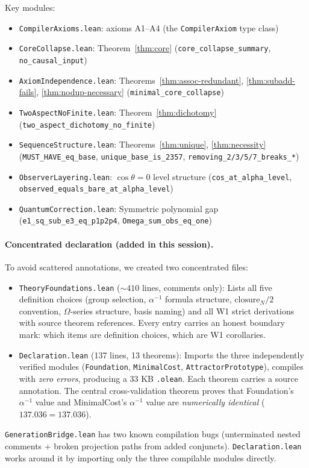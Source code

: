 ﻿\documentclass[11pt]{article}
\begin{document}
Key modules:
\begin{itemize}
\item \texttt{CompilerAxioms.lean}:
  axioms A1--A4 (the \texttt{CompilerAxiom} type class)
\item \texttt{CoreCollapse.lean}:
  Theorem~\ref{thm:core} (\texttt{core\_collapse\_summary},
  \texttt{no\_causal\_input})
\item \texttt{AxiomIndependence.lean}:
  Theorems~\ref{thm:assoc-redundant},
  \ref{thm:subadd-fails}, \ref{thm:nodup-necessary}
  (\texttt{minimal\_core\_collapse})
\item \texttt{TwoAspectNoFinite.lean}:
  Theorem~\ref{thm:dichotomy}
  (\texttt{two\_aspect\_dichotomy\_no\_finite})
\item \texttt{SequenceStructure.lean}:
  Theorems~\ref{thm:unique}, \ref{thm:necessity}
  (\texttt{MUST\_HAVE\_eq\_base},
  \texttt{unique\_base\_is\_2357},
  \texttt{removing\_2/3/5/7\_breaks\_*})
\item \texttt{ObserverLayering.lean}:
  $\cos\theta = 0$ level structure
  (\texttt{cos\_at\_alpha\_level},
  \texttt{observed\_equals\_bare\_at\_alpha\_level})
\item \texttt{QuantumCorrection.lean}:
  Symmetric polynomial gap
  (\texttt{e1\_sq\_sub\_e3\_eq\_p1p2p4},
  \texttt{Omega\_sum\_obs\_eq\_one})
\end{itemize}

\paragraph{Concentrated declaration (added in this session).}
To avoid scattered annotations, we created two concentrated files:
\begin{itemize}
\item \texttt{TheoryFoundations.lean} ($\sim 410$ lines, comments only):
  Lists all five definition choices (group selection,
  $\alpha^{-1}$ formula structure, $\mathrm{closure}_N/2$
  convention, $\Omega$-series structure, basis naming) and
  all W1 strict derivations with source theorem references.
  Every entry carries an honest boundary mark: which items
  are definition choices, which are W1 corollaries.
\item \texttt{Declaration.lean} (137 lines, 13 theorems):
  Imports the three independently verified modules
  (\texttt{Foundation}, \texttt{MinimalCost},
  \texttt{AttractorPrototype}), compiles with \emph{zero
  errors}, producing a 33 KB \texttt{.olean}. Each theorem
  carries a source annotation. The central cross-validation
  theorem proves that Foundation's $\alpha^{-1}$ value and
  MinimalCost's $\alpha^{-1}$ value are \emph{numerically
  identical} ($137.036 = 137.036$).
\end{itemize}
\texttt{GenerationBridge.lean} has two known compilation
bugs (unterminated nested comments + broken projection paths
from added conjuncts). \texttt{Declaration.lean} works around
it by importing only the three compilable modules directly.
\end{document}
